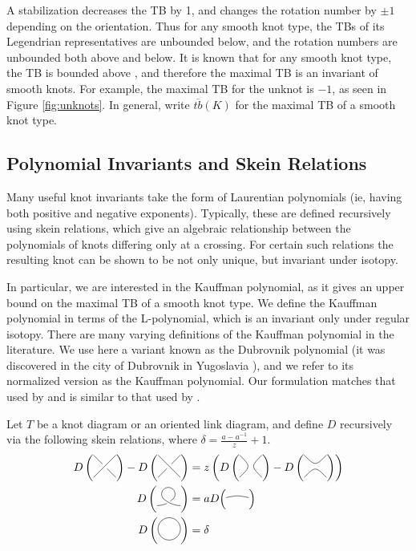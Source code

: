 A stabilization decreases the TB by 1, and changes the rotation number by $\pm 1$ depending on the orientation. Thus for any smooth knot type, the TBs of its Legendrian representatives are unbounded below, and the rotation numbers are unbounded both above and below.
It is known that for any smooth knot type, the TB is bounded above \cite{bennequin}, and therefore the maximal TB is an invariant of smooth knots. For example, the maximal TB for the unknot is $-1$, as seen in Figure \ref{fig:unknots}. In general, write $\overline{tb}(K)$ for the maximal TB of a smooth knot type.

\subsection{Polynomial Invariants and Skein Relations}

Many useful knot invariants take the form of Laurentian polynomials (ie, having both positive and negative exponents). Typically, these are defined recursively using skein relations, which give an algebraic relationship between the polynomials of knots differing only at a crossing. For certain such relations the resulting knot can be shown to be not only unique, but invariant under isotopy.

In particular, we are interested in the Kauffman polynomial, as it gives an upper bound on the maximal TB of a smooth knot type. We define the Kauffman polynomial in terms of the L-polynomial, which is an invariant only under regular isotopy.
There are many varying definitions of the Kauffman polynomial in the literature. We use here a variant known as the Dubrovnik polynomial (it was discovered in the city of Dubrovnik in Yugoslavia \cite{kauffman}), and we refer to its normalized version as the Kauffman polynomial. Our formulation matches that used by \cite{ferrand} and is similar to that used by \cite{lu-zhong}.

Let $T$ be a knot diagram or an oriented link diagram, and define $D$ recursively via the following skein relations, where $\delta = \frac{a - a^{-1}}{z} + 1$.
\begin{align}
    D\left(\Lmin\right) - D\left(\Lplus\right) &= z \left( D\left(\Lzero\right) - D\left(\Linf\right) \right) \\
    D\left(\Lr\right) &= a D \Big(\Ln\Big)\\
    D\left(\Lu\right) &= \delta
\end{align}

